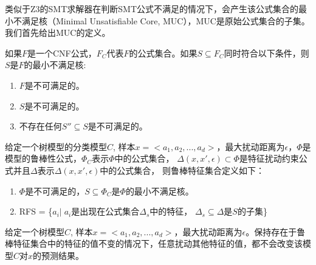 类似于Z3的SMT求解器在判断SMT公式不满足的情况下，会产生该公式集合的最小不满足核（Minimal Unsatisfiable Core, MUC），MUC是原始公式集合的子集。我们首先给出MUC的定义。

\begin{define}[最小不满足核]\label{最小不满足核}

如果$F$是一个CNF公式，$F_C$代表$F$的公式集合。如果$S \subseteq F_C$同时符合以下条件，则$S$是$F$的最小不满足核:

\begin{enumerate}
\item $F$是不可满足的。
\item $S$是不可满足的。
\item 不存在任何$S''\subseteq S$是不可满足的。
\end{enumerate}
\end{define}

\begin{define}[鲁棒特征集合]\label{鲁棒特征集合}
给定一个树模型的分类模型$C$, 样本$x=<a_1,a_2,...,a_d>$，最大扰动距离为$\epsilon$，$\Phi$是模型的鲁棒性公式，$\Phi_C$表示$\Phi$中的公式集合， $\Delta(x, x', \epsilon)\subset \Phi$是特征扰动约束公式并且$\Delta$表示$\Delta(x, x', \epsilon)$中的公式集合， 则鲁棒特征集合定义如下：
\begin{enumerate}
\item $\Phi$是不可满足的，$S\subseteq \Phi_C$是$\Phi$的最小不满足核。
\item RFS = \{$a_i | \;a_i$是出现在公式集合$\Delta_s$中的特征， $\Delta_s \subseteq \Delta$是$S$的子集\}
\end{enumerate}
\end{define}

\begin{theorem}\label{鲁棒特征集合定理}
给定一个树模型$C$, 样本$x=<a_1,a_2,...,a_d>$，最大扰动距离为$\epsilon$。保持存在于鲁棒特征集合中的特征的值不变的情况下，任意扰动其他特征的值，都不会改变该模型$C$对$x$的预测结果。
\end{theorem}

